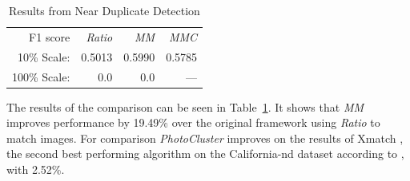 \begin{table}[htb]
\caption{Results from Near Duplicate Detection}
\label{table:ndd}
	\centering
\begin{tabular}{r*{3}{r}}
\hline
F1 score & \emph{Ratio} & \emph{MM} & \emph{MMC}   \\
	\noalign{\smallskip}
    10\% Scale: & 0.5013 & 0.5990 & 0.5785 \\
    100\% Scale: & 0.0 & 0.0 & --- \\
	\hline
\end{tabular}
\end{table}

The results of the comparison can be seen in Table~\ref{table:ndd}. It 
shows that \emph{MM} improves performance by 19.49\% over the original 
framework using \emph{Ratio} to match images. For comparison 
\emph{PhotoCluster} improves on the results of Xmatch 
\cite{zhao2009scale}, the second best performing algorithm on the 
California-nd dataset according to \cite{vas2013cluster}, with 2.52\%.
